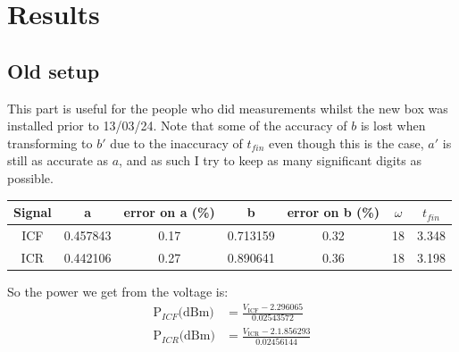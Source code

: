 \documentclass{report}
\begin{document}
\section{Results}
\subsection{Old setup}
This part is useful for the people who did measurements whilst the
new box was installed prior to 13/03/24. Note that some of the
accuracy of $b$ is lost when transforming to $b'$ due to the
inaccuracy of $t_{fin}$ even though this is the case, $a'$ is still
as accurate as $a$, and as such I try to keep as many significant
digits as possible.
\begin{center}
\begin{tabular}{||c c c c c c c||}
 \hline
 Signal & a & error on a (\%) & b & error on b (\%) & $\omega$ & $t_{fin}$\\ [0.5ex]
 \hline\hline
 ICF & 0.457843 & 0.17 & 0.713159 & 0.32 & 18 & 3.348\\
 ICR & 0.442106 & 0.27 & 0.890641 & 0.36 & 18 & 3.198\\
 \hline
\end{tabular}
\end{center}
So the power we get from the voltage is:
\begin{eqnarray}
    \text{P}_{ICF}\text{(dBm)} &= \frac{V_{\text{ICF}}-2.296065}{0.02543572}\\
    \text{P}_{ICR}\text{(dBm)} &= \frac{V_{\text{ICR}}-2.1.856293}{0.02456144}
\end{eqnarray}
\end{document}
